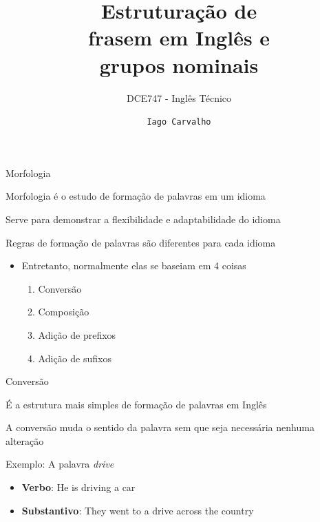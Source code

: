 \documentclass[compress,mathserif,xcolor=table]{beamer}
\title{Estruturação de \\ frasem em Inglês e \\ grupos nominais}
\subtitle{DCE747 - Inglês Técnico}
\author{\texttt{Iago Carvalho}}
\institute{\texttt{Departamento de Ciência da Computação}}
\begin{document}
\begin{frame}
\titlepage

\end{frame}


\begin{frame}{Morfologia}

Morfologia é o estudo de formação de palavras em um idioma

\vspace{0.5cm}

Serve para demonstrar a flexibilidade e adaptabilidade do idioma

\vspace{0.5cm}

Regras de formação de palavras são diferentes para cada idioma
\begin{itemize}
    \item Entretanto, normalmente elas se baseiam em 4 coisas
    \begin{enumerate}
        \item Conversão
        \item Composição
        \item Adição de prefixos
        \item Adição de sufixos
    \end{enumerate}
\end{itemize}
\end{frame}


\begin{frame}{Conversão}

É a estrutura mais simples de formação de palavras em Inglês

\vspace{0.5cm}

A conversão muda o sentido da palavra sem que seja necessária nenhuma alteração

\vspace{0.5cm}

Exemplo: A palavra \textit{drive}
\begin{itemize}
    \item \textbf{Verbo}: He is driving a car
    \item \textbf{Substantivo}: They went to a drive across the country
\end{itemize}
\end{frame}
\end{document}
